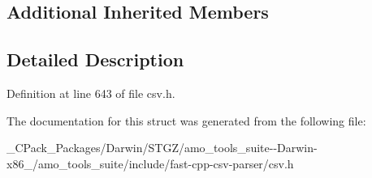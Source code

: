 \subsection*{Additional Inherited Members}


\subsection{Detailed Description}


Definition at line 643 of file csv.\+h.



The documentation for this struct was generated from the following file\+:\begin{DoxyCompactItemize}
\item 
\+\_\+\+C\+Pack\+\_\+\+Packages/\+Darwin/\+S\+T\+G\+Z/amo\+\_\+tools\+\_\+suite-\/-\/\+Darwin-\/x86\+\_/amo\+\_\+tools\+\_\+suite/include/fast-\/cpp-\/csv-\/parser/csv.\+h\end{DoxyCompactItemize}

